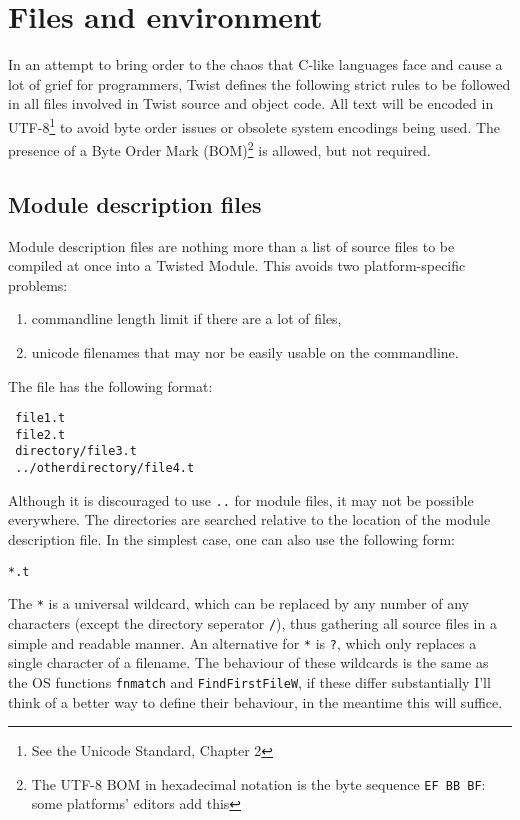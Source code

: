 \documentclass[a4paper,11pt]{report}
\newcommand{\tcode}[1]{\texttt{#1}}
\begin{document}
\section{Files and environment}

In an attempt to bring order to the chaos that C-like languages face and cause a lot of grief for programmers, Twist defines the following strict rules to be followed in all files involved in Twist source and object code.
All text will be encoded in UTF-8\footnote{See the Unicode Standard, Chapter 2} to avoid byte order issues or obsolete system encodings being used.
The presence of a Byte Order Mark (BOM)\footnote{The UTF-8 BOM in hexadecimal notation is the byte sequence \tcode{EF BB BF}: some platforms' editors add this} is allowed, but not required.

\subsection{Module description files}

Module description files are nothing more than a list of source files to be compiled at once into a Twisted Module.
This avoids two platform-specific problems:
\begin{enumerate}
 \item commandline length limit if there are a lot of files,
 \item unicode filenames that may nor be easily usable on the commandline.
\end{enumerate}
The file has the following format:
\begin{lstlisting}
 file1.t
 file2.t
 directory/file3.t
 ../otherdirectory/file4.t
\end{lstlisting}
Although it is discouraged to use \tcode{..} for module files, it may not be possible everywhere.
The directories are searched relative to the location of the module description file.
In the simplest case, one can also use the following form:
\begin{lstlisting}
*.t
\end{lstlisting}
The \tcode{*} is a universal wildcard, which can be replaced by any number of any characters (except the directory seperator \tcode{/}), thus gathering all source files in a simple and readable manner.
An alternative for \tcode{*} is \tcode{?}, which only replaces a single character of a filename.
The behaviour of these wildcards is the same as the OS functions \tcode{fnmatch} and \tcode{FindFirstFileW}, if these differ substantially I'll think of a better way to define their behaviour, in the meantime this will suffice.
\end{document}
